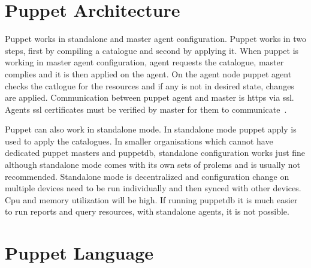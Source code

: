 \section{Puppet Architecture}
Puppet works in standalone and master agent configuration. Puppet works in two
steps, first by compiling a catalogue and second by applying it. When puppet is
working in master agent configuration, agent requests the catalogue, master
complies and it is then applied on the agent. On the agent node puppet agent
checks the catlogue for the resources and if any is not in desired state,
changes are applied. Communication between puppet agent and master is https via
ssl. Agents ssl certificates must be verified by master for them to
communicate~\cite{hid-sp18-413-puppet-architecture}. \par
Puppet can also work in standalone mode. In standalone mode puppet apply is used
to apply the catalogues. In smaller organisations which cannot have dedicated
puppet masters and puppetdb, standalone configuration works just fine although  standalone mode comes with its own sets of prolems and
is usually not recommended. Standalone mode is decentralized and configuration
change on multiple devices need to be run individually and then synced with
other devices. Cpu and memory utilization will be high. If running puppetdb it
is much easier to run reports and query resources, with standalone agents, it is
not possible. 

\section{Puppet Language}

